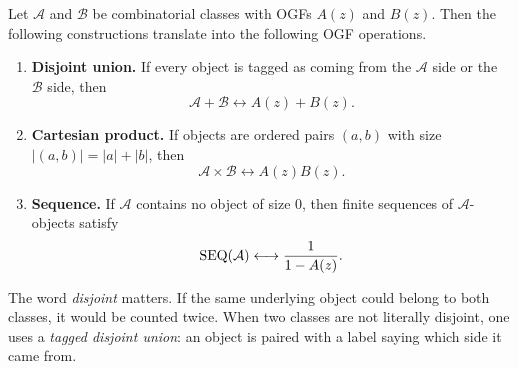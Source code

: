 \begin{proposition}
\label{prop:symbolic-ogf}
Let $\mathcal{A}$ and $\mathcal{B}$ be combinatorial classes with OGFs $A(z)$ and $B(z)$. Then the following constructions translate into the following OGF operations.
\begin{enumerate}
  \item \textbf{Disjoint union.} If every object is tagged as coming from the $\mathcal{A}$ side or the $\mathcal{B}$ side, then
  \[
    \mathcal{A} + \mathcal{B} \longleftrightarrow A(z)+B(z).
  \]
  \item \textbf{Cartesian product.} If objects are ordered pairs $(a,b)$ with size $|(a,b)|=|a|+|b|$, then
  \[
    \mathcal{A} \times \mathcal{B} \longleftrightarrow A(z)B(z).
  \]
  \item \textbf{Sequence.} If $\mathcal{A}$ contains no object of size $0$, then finite sequences of $\mathcal{A}$-objects satisfy
  \[
    \operatorname{SEQ}(\mathcal{A}) \longleftrightarrow \frac{1}{1-A(z)}.
  \]
\end{enumerate}
\end{proposition}

The word \emph{disjoint} matters. If the same underlying object could belong to both classes, it would be counted twice. When two classes are not literally disjoint, one uses a \emph{tagged disjoint union}: an object is paired with a label saying which side it came from.

